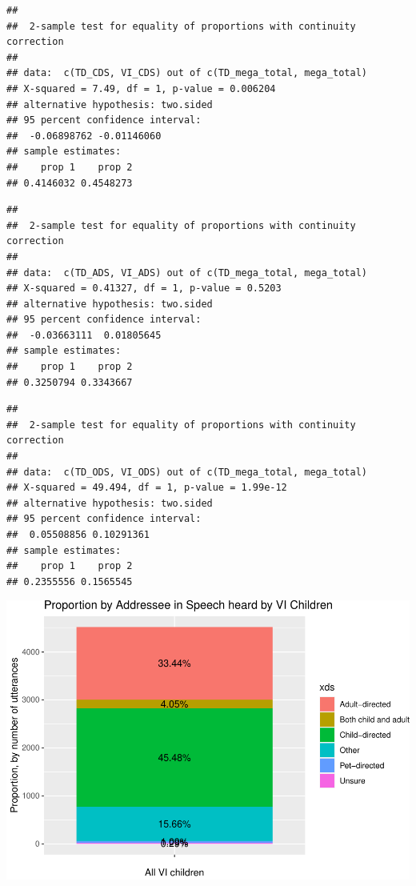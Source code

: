 \documentclass[english,man]{apa6}
\begin{document}
\begin{verbatim}
## 
##  2-sample test for equality of proportions with continuity correction
## 
## data:  c(TD_CDS, VI_CDS) out of c(TD_mega_total, mega_total)
## X-squared = 7.49, df = 1, p-value = 0.006204
## alternative hypothesis: two.sided
## 95 percent confidence interval:
##  -0.06898762 -0.01146060
## sample estimates:
##    prop 1    prop 2 
## 0.4146032 0.4548273
\end{verbatim}

\begin{verbatim}
## 
##  2-sample test for equality of proportions with continuity correction
## 
## data:  c(TD_ADS, VI_ADS) out of c(TD_mega_total, mega_total)
## X-squared = 0.41327, df = 1, p-value = 0.5203
## alternative hypothesis: two.sided
## 95 percent confidence interval:
##  -0.03663111  0.01805645
## sample estimates:
##    prop 1    prop 2 
## 0.3250794 0.3343667
\end{verbatim}

\begin{verbatim}
## 
##  2-sample test for equality of proportions with continuity correction
## 
## data:  c(TD_ODS, VI_ODS) out of c(TD_mega_total, mega_total)
## X-squared = 49.494, df = 1, p-value = 1.99e-12
## alternative hypothesis: two.sided
## 95 percent confidence interval:
##  0.05508856 0.10291361
## sample estimates:
##    prop 1    prop 2 
## 0.2355556 0.1565545
\end{verbatim}

\includegraphics{input_quality_manuscript_files/figure-latex/addressee-prop-graphs-1.pdf}
\end{document}
